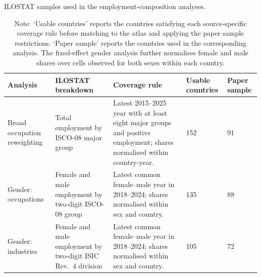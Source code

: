 \begin{table}[H]
\centering
\scriptsize
\setlength{\tabcolsep}{2pt}
\renewcommand{\arraystretch}{1.08}
\caption{ILOSTAT samples used in the employment-composition analyses.}
\begin{tabularx}{\textwidth}{@{}L{0.16\textwidth}L{0.23\textwidth}X C{0.08\textwidth} C{0.08\textwidth}@{}}
\toprule
Analysis & ILOSTAT breakdown & Coverage rule & Usable countries & Paper sample \\
\midrule
Broad occupation reweighting
& Total employment by ISCO-08 major group
& Latest 2015--2025 year with at least eight major groups and positive employment; shares normalised within country-year.
& 152 & 91 \\

Gender: occupations
& Female and male employment by two-digit ISCO-08 group
& Latest common female--male year in 2018--2024; shares normalised within sex and country.
& 135 & 88 \\

Gender: industries
& Female and male employment by two-digit ISIC Rev.~4 division
& Latest common female--male year in 2018--2024; shares normalised within sex and country.
& 105 & 72 \\
\bottomrule
\end{tabularx}
\caption*{\scriptsize Note: `Usable countries' reports the countries satisfying each source-specific coverage rule before matching to the atlas and applying the paper sample restrictions. `Paper sample' reports the countries used in the corresponding analysis. The fixed-effect gender analysis further normalises female and male shares over cells observed for both sexes within each country.}
\label{tab:appendix_ilostat_coverage}
\end{table}
